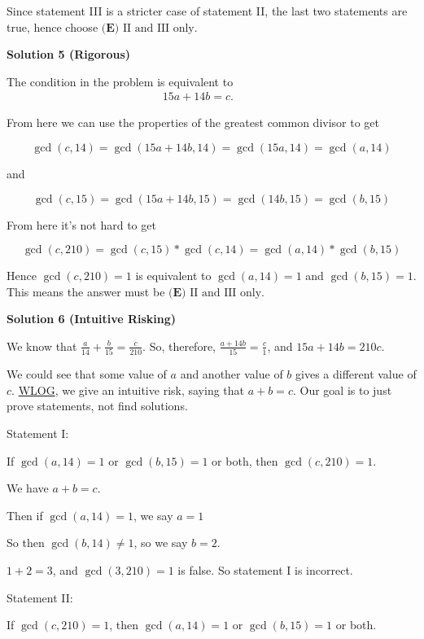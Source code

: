 \begin{enumerate}
 
Since statement III is a stricter case of statement II, the last two statements are true, hence choose $\boxed{\textbf{(E) }\text{II and III only}}.$




\textbf{Solution 5 (Rigorous)}

The condition in the problem is equivalent to\begin{align*}15 a + 14 b = c. \hspace{1cm} \end{align*}


 From here we can use the properties of the greatest common divisor to get

 
 \[\gcd(c, 14)=\gcd(15a+14b, 14)=\gcd(15a, 14)=\gcd(a, 14)\]

 and

 
 \[\gcd(c, 15)=\gcd(15a+14b, 15)=\gcd(14b, 15)=\gcd(b, 15)\]

 From here it's not hard to get

 
 \[\gcd(c, 210)=\gcd(c, 15)*\gcd(c, 14)=\gcd(a, 14)*\gcd(b, 15)\]

 Hence $\gcd(c, 210)=1$ is equivalent to $\gcd(a, 14)=1$ and $\gcd(b, 15)=1$. This means the answer must be $\boxed{\textbf{(E) }\text{II and III only}}.$




\textbf{Solution 6 (Intuitive Risking)}

We know that \( \frac{a}{14} + \frac{b}{15} = \frac{c}{210} \). So, therefore, \( \frac{a + 14b}{15} = \frac{c}{1} \), and \( 15a + 14b = 210c \).

 We could see that some value of \(a\) and another value of \(b\) gives a different value of \(c\). \href{https://artofproblemsolving.com/wiki/index.php?title=WLOG}{WLOG}, we give an intuitive risk, saying that \( a + b = c \). Our goal is to just prove statements, not find solutions.

 Statement I:

 If \( \gcd(a,14) = 1 \) or \( \gcd(b,15) = 1 \) or both, then \( \gcd(c,210) = 1 \).

 We have \( a + b = c \).

 Then if \( \gcd(a,14) = 1 \), we say \( a = 1 \)

 So then \( \gcd(b,14) \neq 1 \), so we say \( b = 2 \).

 \( 1 + 2 = 3 \), and \( \gcd(3,210) = 1 \) is false. So statement I is incorrect.

 Statement II:

 If \( \gcd(c,210) = 1 \), then \( \gcd(a,14) = 1 \) or \( \gcd(b,15) = 1 \) or both.


\end{enumerate}
